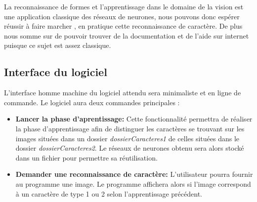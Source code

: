 La reconnaissance de formes et l'apprentissage dans le domaine de la vision est une application classique des réseaux de neurones, nous pouvons donc espérer réussir à faire marcher , en pratique cette reconnaissance de caractère. De plus nous somme sur de pouvoir trouver de la documentation et de l'aide sur internet puisque ce sujet est assez classique.

	\subsection{Interface du logiciel}

L'interface homme machine du logiciel attendu sera minimaliste et en ligne de
commande. Le logiciel aura deux commandes principales :

\begin{itemize}
	\item \textbf{Lancer la phase d'aprentissage:}	\newline 
		Cette fonctionnalit\'e permettra de r\'ealiser la phase d’apprentissage afin de distinguer les caract\`eres se trouvant sur les images situ\'ees dans un dossier \textit{dossierCaracteres1} de celles situ\'ees dans le dossier \textit{dossierCaracteres2}. Le r\'eseaux de neurones obtenu sera alors stock\'e dans un fichier pour permettre sa r\'eutilisation.
	\item \textbf{Demander une reconnaissance de caract\`ere:} \newline
		L'utilisateur pourra fournir au programme une image. Le programme affichera alors si l'image correspond à un caract\`ere de type 1 ou 2 selon l'apprentissage pr\'ec\'edent.
\end{itemize}